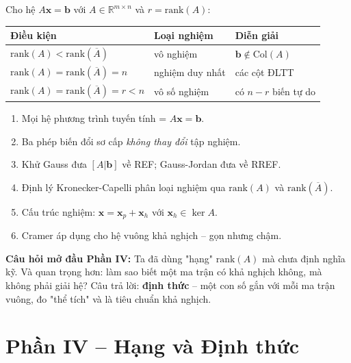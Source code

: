 \documentclass[12pt,a4paper]{article}
\begin{document}
\begin{tinhchat}[title={Phân loại nghiệm theo hạng}]
Cho hệ $A\mathbf{x} = \mathbf{b}$ với $A \in \mathbb{R}^{m\times n}$ và $r = \mathrm{rank}(A)$:
\begin{center}
\begin{tabular}{lll}
\toprule
Điều kiện & Loại nghiệm & Diễn giải \\
\midrule
$\mathrm{rank}(A) < \mathrm{rank}(\overline{A})$ & vô nghiệm & $\mathbf{b} \notin \mathrm{Col}(A)$ \\
$\mathrm{rank}(A) = \mathrm{rank}(\overline{A}) = n$ & nghiệm duy nhất & các cột ĐLTT \\
$\mathrm{rank}(A) = \mathrm{rank}(\overline{A}) = r < n$ & vô số nghiệm & có $n-r$ biến tự do \\
\bottomrule
\end{tabular}
\end{center}
\end{tinhchat}

\begin{tongket}[title={Tổng kết Phần III}]
\begin{enumerate}
  \item Mọi hệ phương trình tuyến tính = $A\mathbf{x} = \mathbf{b}$.
  \item Ba phép biến đổi sơ cấp \emph{không thay đổi} tập nghiệm.
  \item Khử Gauss đưa $[A|\mathbf{b}]$ về REF; Gauss-Jordan đưa về RREF.
  \item Định lý Kronecker-Capelli phân loại nghiệm qua $\mathrm{rank}(A)$ và $\mathrm{rank}(\overline{A})$.
  \item Cấu trúc nghiệm: $\mathbf{x} = \mathbf{x}_p + \mathbf{x}_h$ với $\mathbf{x}_h \in \ker A$.
  \item Cramer áp dụng cho hệ vuông khả nghịch -- gọn nhưng chậm.
\end{enumerate}

\textbf{Câu hỏi mở đầu Phần IV:} Ta đã dùng "hạng" $\mathrm{rank}(A)$ mà chưa định nghĩa kỹ. Và quan trọng hơn: làm sao biết một ma trận có khả nghịch không, mà không phải giải hệ? Câu trả lời: \textbf{định thức} -- một con số gắn với mỗi ma trận vuông, đo "thể tích" và là tiêu chuẩn khả nghịch.
\end{tongket}

\newpage

\section{Phần IV -- Hạng và Định thức}
\end{document}
